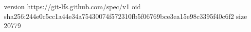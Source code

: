 version https://git-lfs.github.com/spec/v1
oid sha256:244e0c5cc1a44e34a75430074f572310fb5f06769bce3ea15e98c3395f40c6f2
size 20779
